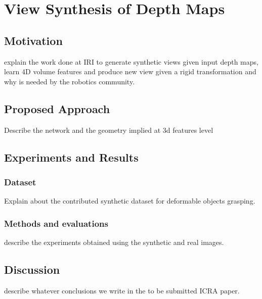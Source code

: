 \chapter{View Synthesis of Depth Maps}
\label{chap:chap_05}
\vspace{-8mm}

\section{Motivation}

explain the work done at IRI to generate synthetic views given input depth maps, learn 4D volume features and produce new view given a rigid transformation and why is needed by the robotics community.

\section{Proposed Approach}

Describe the network and the geometry implied at 3d features level


\section{Experiments and Results}

\subsection{Dataset}

Explain about the contributed synthetic dataset for deformable objects grasping.

\subsection{Methods and evaluations}

describe the experiments obtained using the synthetic and real images.

\section{Discussion}

describe whatever conclusions we write in the to be submitted ICRA paper.\cite{eriba2020icra}